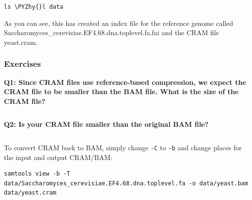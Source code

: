 \documentclass[11pt]{article}
\makeatletter
\def\PYZhy{\char`\-}
\newcommand{\boxspacing}{\kern\kvtcb@left@rule\kern\kvtcb@boxsep}
\newcommand{\prompt}[4]{
        {\ttfamily\llap{{\color{blue}\LARGE\faKeyboardO\hspace{3pt}#4}}\vspace{-\baselineskip}}
    }
\makeatother
\begin{document}
    \begin{tcolorbox}[breakable, size=fbox, boxrule=1pt, pad at break*=1mm,colback=cellbackground, colframe=cellborder]
\prompt{In}{incolor}{ }{\boxspacing}
\begin{Verbatim}[commandchars=\\\{\}]
ls \PYZhy{}l data
\end{Verbatim}
\end{tcolorbox}

    As you can see, this has created an index file for the reference genome
called Saccharomyces\_cerevisiae.EF4.68.dna.toplevel.fa.fai and the CRAM
file yeast.cram.

    \hypertarget{exercises}{%
\subsubsection{Exercises}\label{exercises}}

\textbf{Q1: Since CRAM files use reference-based compression, we expect
the CRAM file to be smaller than the BAM file. What is the size of the
CRAM file?}

    \begin{tcolorbox}[breakable, size=fbox, boxrule=1pt, pad at break*=1mm,colback=cellbackground, colframe=cellborder]
\prompt{In}{incolor}{ }{\boxspacing}
\begin{Verbatim}[commandchars=\\\{\}]

\end{Verbatim}
\end{tcolorbox}

    \textbf{Q2: Is your CRAM file smaller than the original BAM file?}

    \begin{tcolorbox}[breakable, size=fbox, boxrule=1pt, pad at break*=1mm,colback=cellbackground, colframe=cellborder]
\prompt{In}{incolor}{ }{\boxspacing}
\begin{Verbatim}[commandchars=\\\{\}]

\end{Verbatim}
\end{tcolorbox}

    To convert CRAM back to BAM, simply change \texttt{-C} to \texttt{-b}
and change places for the input and output CRAM/BAM:

\begin{verbatim}
samtools view -b -T data/Saccharomyces_cerevisiae.EF4.68.dna.toplevel.fa -o data/yeast.bam data/yeast.cram
\end{verbatim}
\end{document}

